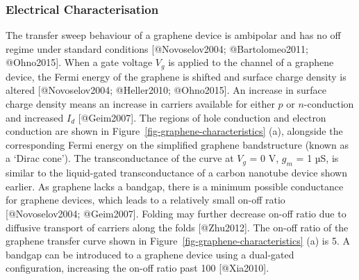 \documentclass[
  letterpaper,
  DIV=11,
  numbers=noendperiod]{scrartcl}
\begin{document}
\subsubsection{Electrical
Characterisation}\label{sec-electrical-characterisation-graphene}

The transfer sweep behaviour of a graphene device is ambipolar and has
no off regime under standard conditions {[}@Novoselov2004;
@Bartolomeo2011; @Ohno2015{]}. When a gate voltage \(V_g\) is applied to
the channel of a graphene device, the Fermi energy of the graphene is
shifted and surface charge density is altered {[}@Novoselov2004;
@Heller2010; @Ohno2015{]}. An increase in surface charge density means
an increase in carriers available for either \(p\) or \(n\)-conduction
and increased \(I_d\) {[}@Geim2007{]}. The regions of hole conduction
and electron conduction are shown in
Figure~\ref{fig-graphene-characteristics} (a), alongside the
corresponding Fermi energy on the simplified graphene bandstructure
(known as a `Dirac cone'). The transconductance of the curve at \(V_g\)
= 0 V, \(g_m\) = 1 µS, is similar to the liquid-gated transconductance
of a carbon nanotube device shown earlier. As graphene lacks a bandgap,
there is a minimum possible conductance for graphene devices, which
leads to a relatively small on-off ratio {[}@Novoselov2004;
@Geim2007{]}. Folding may further decrease on-off ratio due to diffusive
transport of carriers along the folds {[}@Zhu2012{]}. The on-off ratio
of the graphene transfer curve shown in
Figure~\ref{fig-graphene-characteristics} (a) is 5. A bandgap can be
introduced to a graphene device using a dual-gated configuration,
increasing the on-off ratio past 100 {[}@Xia2010{]}.
\end{document}
